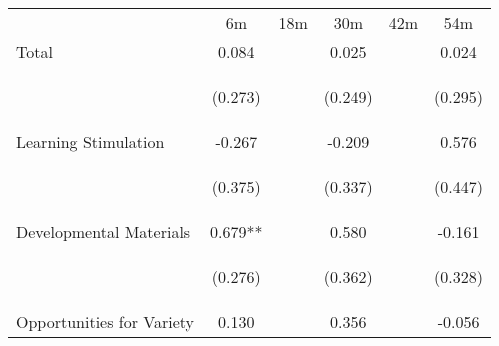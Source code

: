 \begin{tabular}{lccccc}
\hline \noalign{\smallskip} & 6m & 18m & 30m & 42m & 54m\\
\noalign{\smallskip}\hline \noalign{\smallskip}Total & 0.084 &  & 0.025 &  & 0.024\\
 & \begin{footnotesize}(0.273)\end{footnotesize} & \begin{footnotesize}\end{footnotesize} & \begin{footnotesize}(0.249)\end{footnotesize} & \begin{footnotesize}\end{footnotesize} & \begin{footnotesize}(0.295)\end{footnotesize}\\
\noalign{\smallskip}Learning Stimulation & -0.267 &  & -0.209 &  & 0.576\\
 & \begin{footnotesize}(0.375)\end{footnotesize} & \begin{footnotesize}\end{footnotesize} & \begin{footnotesize}(0.337)\end{footnotesize} & \begin{footnotesize}\end{footnotesize} & \begin{footnotesize}(0.447)\end{footnotesize}\\
\noalign{\smallskip}Developmental Materials & 0.679** &  & 0.580 &  & -0.161\\
 & \begin{footnotesize}(0.276)\end{footnotesize} & \begin{footnotesize}\end{footnotesize} & \begin{footnotesize}(0.362)\end{footnotesize} & \begin{footnotesize}\end{footnotesize} & \begin{footnotesize}(0.328)\end{footnotesize}\\
\noalign{\smallskip}Opportunities for Variety & 0.130 &  & 0.356 &  & -0.056\\

\end{tabular}
